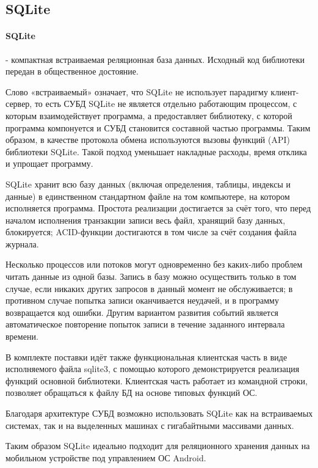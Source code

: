 \subsection{SQLite}
\paragraph{SQLite} - компактная встраиваемая реляционная база данных. Исходный код библиотеки передан в общественное достояние.

Слово «встраиваемый» означает, что SQLite не использует парадигму клиент-сервер, то есть СУБД SQLite не является отдельно работающим процессом, с которым взаимодействует программа, а предоставляет библиотеку, с которой программа компонуется и СУБД становится составной частью программы. Таким образом, в качестве протокола обмена используются вызовы функций (API) библиотеки SQLite. Такой подход уменьшает накладные расходы, время отклика и упрощает программу.

SQLite хранит всю базу данных (включая определения, таблицы, индексы и данные) в единственном стандартном файле на том компьютере, на котором исполняется программа. Простота реализации достигается за счёт того, что перед началом исполнения транзакции записи весь файл, хранящий базу данных, блокируется; ACID-функции достигаются в том числе за счёт создания файла журнала.

Несколько процессов или потоков могут одновременно без каких-либо проблем читать данные из одной базы. Запись в базу можно осуществить только в том случае, если никаких других запросов в данный момент не обслуживается; в противном случае попытка записи оканчивается неудачей, и в программу возвращается код ошибки. Другим вариантом развития событий является автоматическое повторение попыток записи в течение заданного интервала времени.

В комплекте поставки идёт также функциональная клиентская часть в виде исполняемого файла sqlite3, с помощью которого демонстрируется реализация функций основной библиотеки. Клиентская часть работает из командной строки, позволяет обращаться к файлу БД на основе типовых функций ОС.

Благодаря архитектуре СУБД возможно использовать SQLite как на встраиваемых системах, так и на выделенных машинах с гигабайтными массивами данных.

Таким образом SQLite идеально подходит для реляционного хранения данных на мобильном устройстве под управлением ОС Android.


